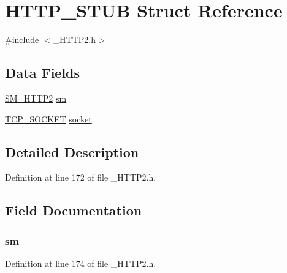\hypertarget{struct_h_t_t_p___s_t_u_b}{}\section{H\+T\+T\+P\+\_\+\+S\+T\+U\+B Struct Reference}
\label{struct_h_t_t_p___s_t_u_b}


{\ttfamily \#include $<$\+\_\+\+H\+T\+T\+P2.\+h$>$}

\subsection*{Data Fields}
\begin{DoxyCompactItemize}
\item 
\hyperlink{___h_t_t_p2_8h_ab9b6d77e507c2280fc308de3a5e04d7e}{S\+M\+\_\+\+H\+T\+T\+P2} \hyperlink{struct_h_t_t_p___s_t_u_b_a32f692486a6521cde6618bae847aa6c3}{sm}
\item 
\hyperlink{_t_c_p_8h_abe3757e564cff2f301e49564cbb5f878}{T\+C\+P\+\_\+\+S\+O\+C\+K\+E\+T} \hyperlink{struct_h_t_t_p___s_t_u_b_a16977cce566f5643908528edfb9c395a}{socket}
\end{DoxyCompactItemize}


\subsection{Detailed Description}


Definition at line 172 of file \+\_\+\+H\+T\+T\+P2.\+h.



\subsection{Field Documentation}
\hypertarget{struct_h_t_t_p___s_t_u_b_a32f692486a6521cde6618bae847aa6c3}{}
\subsubsection[{sm}]{ sm}\label{struct_h_t_t_p___s_t_u_b_a32f692486a6521cde6618bae847aa6c3}


Definition at line 174 of file \+\_\+\+H\+T\+T\+P2.\+h.

\hypertarget{struct_h_t_t_p___s_t_u_b_a16977cce566f5643908528edfb9c395a}{}
